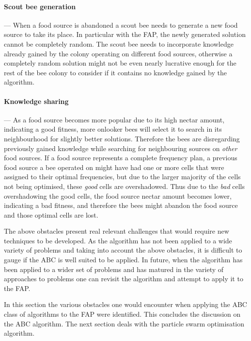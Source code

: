 \paragraph{Scout bee generation}
--- When a food source is abandoned a scout bee needs to generate a new food source to take its place. In particular with the FAP, the newly generated solution cannot be completely random. The scout bee needs to incorporate knowledge already gained by the colony operating on different food sources, otherwise a completely random solution might not be even nearly lucrative enough for the rest of the bee colony to consider if it contains no knowledge gained by the algorithm.
\paragraph{Knowledge sharing}
--- As a food source becomes more popular due to its high nectar amount, indicating a good fitness, more onlooker bees will select it to search in its neighbourhood for slightly better solutions. Therefore the bees are disregarding previously gained knowledge while searching for neighbouring sources on \emph{other} food sources. If a food source represents a complete frequency plan, a previous food source a bee operated on might have had one or more cells that were assigned to their optimal frequencies, but due to the larger majority of the cells not being optimised, these \emph{good} cells are overshadowed. Thus due to the \emph{bad} cells overshadowing the good cells, the food source nectar amount becomes lower, indicating a bad fitness, and therefore the bees might abandon the food source and those optimal cells are lost.

The above obstacles present real relevant challenges that would require new techniques to be developed. As the algorithm has not been applied to a wide variety of problems and taking into account the above obstacles, it is difficult to gauge if the ABC is well suited to be applied. In future, when the algorithm has been applied to a wider set of problems and has matured in the variety of approaches to problems one can revisit the algorithm and attempt to apply it to the FAP.

In this section the various obstacles one would encounter when applying the ABC class of algorithms to the FAP were identified. This concludes the discussion on the ABC algorithm. The next section deals with the particle swarm optimisation algorithm.

